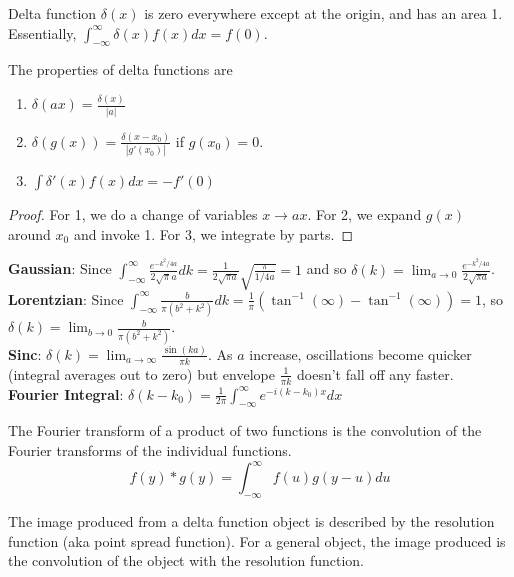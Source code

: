 \documentclass[a4paper]{article}
\begin{document}
\begin{defi}
Delta function $\delta(x)$ is zero everywhere except at the origin, and has an area 1. Essentially, $\int_{-\infty}^\infty\delta(x)f(x)dx=f(0)$.
\end{defi}
\begin{thm}
The properties of delta functions are
\begin{enumerate}
    \item $\delta(ax)=\frac{\delta(x)}{|a|}$
    \item $\delta(g(x))=\frac{\delta(x-x_0)}{|g'(x_0)|}$ if $g(x_0)=0$.
    \item $\int\delta'(x)f(x)dx=-f'(0)$
\end{enumerate}
\end{thm}
\begin{proof}
For 1, we do a change of variables $x\rightarrow ax$. For 2, we expand $g(x)$ around $x_0$ and invoke 1. For 3, we integrate by parts.
\end{proof}
\begin{eg}
\textbf{Gaussian}: Since $\int_{-\infty}^\infty\frac{e^{-k^2/4a}}{2\sqrt{\pi}a}dk=\frac{1}{2\sqrt{\pi a}}\sqrt{\frac{\pi}{1/4a}}=1$ and so $\delta(k)=\lim_{a\rightarrow0}\frac{e^{-k^2/4a}}{2\sqrt{\pi a}}$.\\[5pt]
\textbf{Lorentzian}: Since $\int_{-\infty}^\infty\frac{b}{\pi(b^2+k^2)}dk=\frac{1}{\pi}(\tan^{-1}(\infty)-\tan^{-1}(\infty))=1$, so $\delta(k)=\lim_{b\rightarrow0}\frac{b}{\pi(b^2+k^2)}$.\\[5pt]
\textbf{Sinc}: $\delta(k)=\lim_{a\rightarrow\infty}\frac{\sin(ka)}{\pi k}$. As $a$ increase, oscillations become quicker (integral averages out to zero) but envelope $\frac{1}{\pi k}$ doesn't fall off any faster.\\[5pt]
\textbf{Fourier Integral}: $\delta(k-k_0)=\frac{1}{2\pi}\int_{-\infty}^\infty e^{-i(k-k_0)x}dx$
\end{eg}
\begin{defi}
The Fourier transform of a product of two functions is the convolution of the Fourier transforms of the individual functions.
$$f(y)*g(y)=\int_{-\infty}^\infty f(u)g(y-u)du$$
\end{defi}
\begin{Note}[Application]
The image produced from a delta function object is described by the resolution function (aka point spread function). For a general object, the image produced is the convolution of the object with the resolution function.
\end{Note}
\end{document}
